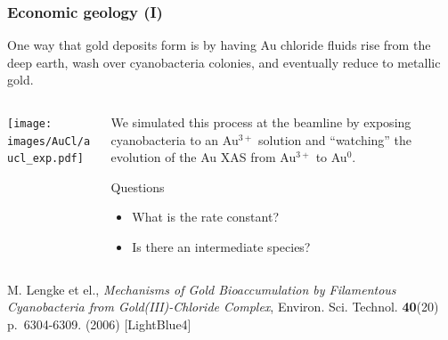 \documentclass[10pt, xcolor=x11names, compress]{beamer}
\begin{document}
\begin{frame}
  \frametitle{Economic geology (I)}

  One way that gold deposits form is by having Au chloride fluids rise
  from the deep earth, wash over cyanobacteria colonies, and
  eventually reduce to metallic gold.

  \begin{columns}
    \begin{column}{0.5\linewidth}
      \texttt{[image: images/AuCl/aucl\_exp.pdf]}
    \end{column}
    \begin{column}{0.5\linewidth}
      We simulated this process at the beamline by exposing
      cyanobacteria to an Au$^{3+}$ solution and ``watching'' the
      evolution of the Au XAS from Au$^{3+}$ to Au$^0$.

      \begin{block}{Questions}
        \begin{itemize}
        \item What is the rate constant?
        \item Is there an intermediate species?
        \end{itemize}
      \end{block}
    \end{column}
  \end{columns}

  \begin{bottomnote}[0.5][19]
    M. Lengke et el., \textit{Mechanisms of Gold Bioaccumulation by
      Filamentous Cyanobacteria from Gold(III)-Chloride Complex},
    Environ. Sci. Technol. \textbf{40}(20) p.~6304-6309. (2006)
    [LightBlue4]
  \end{bottomnote}
\end{frame}
\end{document}

